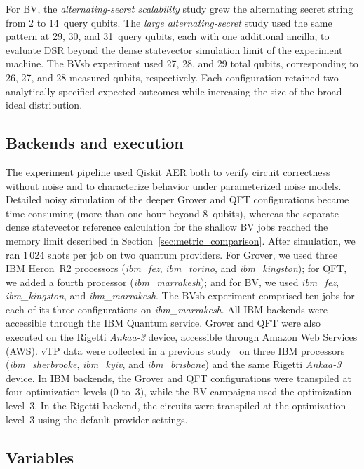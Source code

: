 \documentclass[10pt,conference]{IEEEtran}
\begin{document}
For BV, the \emph{alternating-secret scalability} study grew the alternating secret string from 2 to 14~query qubits. The \emph{large alternating-secret} study used the same pattern at 29, 30, and 31~query qubits, each with one additional ancilla, to evaluate DSR beyond the dense statevector simulation limit of the experiment machine. The BVsb experiment used 27, 28, and 29 total qubits, corresponding to 26, 27, and 28 measured qubits, respectively. Each configuration retained two analytically specified expected outcomes while increasing the size of the broad ideal distribution.

\subsection{Backends and execution}

The experiment pipeline used Qiskit AER both to verify circuit correctness without noise and to characterize behavior under parameterized noise models. Detailed noisy simulation of the deeper Grover and QFT configurations became time-consuming (more than one hour beyond 8~qubits), whereas the separate dense statevector reference calculation for the shallow BV jobs reached the memory limit described in Section~\ref{sec:metric_comparison}. After simulation, we ran 1\,024 shots per job on two quantum providers. For Grover, we used three IBM Heron~R2 processors (\textit{ibm\_fez}, \textit{ibm\_torino}, and \textit{ibm\_kingston}); for QFT, we added a fourth processor (\textit{ibm\_marrakesh}); and for BV, we used \textit{ibm\_fez}, \textit{ibm\_kingston}, and \textit{ibm\_marrakesh}. The BVsb experiment comprised ten jobs for each of its three configurations on \textit{ibm\_marrakesh}. All IBM backends were accessible through the IBM Quantum service. Grover and QFT were also executed on the Rigetti \textit{Ankaa-3} device, accessible through Amazon Web Services (AWS). vTP data were collected in a previous study~\cite{vTPMarquez_2026} on three IBM processors (\textit{ibm\_sherbrooke}, \textit{ibm\_kyiv}, and \textit{ibm\_brisbane}) and the same Rigetti \textit{Ankaa-3} device. In IBM backends, the Grover and QFT configurations were transpiled at four optimization levels (0 to~3), while the BV campaigns used the optimization level~3. In the Rigetti backend, the circuits were transpiled at the optimization level~3 using the default provider settings.

\subsection{Variables}
\end{document}
